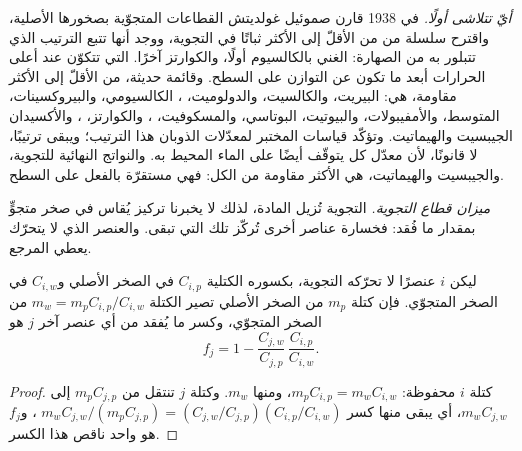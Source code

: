 \emph{أيّ  تتلاشى أولًا.} في 1938 قارن صموئيل غولديتش القطاعات المتجوّية بصخورها الأصلية، واقترح سلسلة من  من الأقلّ إلى الأكثر ثباتًا في التجوية، ووجد أنها تتبع الترتيب الذي تتبلور به من الصهارة:   الغني بالكالسيوم أولًا، والكوارتز آخرًا.  التي تتكوّن عند أعلى الحرارات أبعد ما تكون عن التوازن على السطح. وقائمة حديثة، من الأقلّ إلى الأكثر مقاومة، هي: البيريت، والكالسيت، والدولوميت، ،  الكالسيومي، والبيروكسينات،  المتوسط، والأمفيبولات، والبيوتيت،  البوتاسي، والمسكوفيت، ، والكوارتز، ، والأكسيدان الجيبسيت والهيماتيت. وتؤكّد قياسات المختبر لمعدّلات الذوبان هذا الترتيب؛ ويبقى ترتيبًا، لا قانونًا، لأن معدّل كل  يتوقّف أيضًا على الماء المحيط به. والنواتج النهائية للتجوية،  والجيبسيت والهيماتيت، هي الأكثر مقاومة من الكل: فهي مستقرّة بالفعل على السطح.

\emph{ميزان قطاع التجوية.} التجوية تُزيل المادة، لذلك لا يخبرنا تركيز يُقاس في صخر متجوٍّ بمقدار ما فُقد: فخسارة عناصر أخرى تُركّز تلك التي تبقى. والعنصر الذي لا يتحرّك يعطي المرجع.

\begin{proposition}\label{prop:b1:weathering-clays:immobile}
ليكن $i$ عنصرًا لا تحرّكه التجوية، بكسوره الكتلية $C_{i,p}$ في الصخر الأصلي و$C_{i,w}$ في الصخر المتجوّي. فإن كتلة $m_p$ من الصخر الأصلي تصير الكتلة $m_w = m_p C_{i,p}/C_{i,w}$ من الصخر المتجوّي، وكسر ما يُفقد من أي عنصر آخر $j$ هو
\[
  f_j = 1 - \frac{C_{j,w}}{C_{j,p}}\,\frac{C_{i,p}}{C_{i,w}} .
\]
\end{proposition}

\begin{proof}
كتلة $i$ محفوظة: $m_p C_{i,p} = m_w C_{i,w}$، ومنها $m_w$. وكتلة $j$ تنتقل من $m_p C_{j,p}$ إلى $m_w C_{j,w}$، أي يبقى منها كسر
$m_w C_{j,w}/(m_p C_{j,p}) = (C_{j,w}/C_{j,p})(C_{i,p}/C_{i,w})$ ، و$f_j$ هو واحد ناقص هذا الكسر.
\end{proof}

